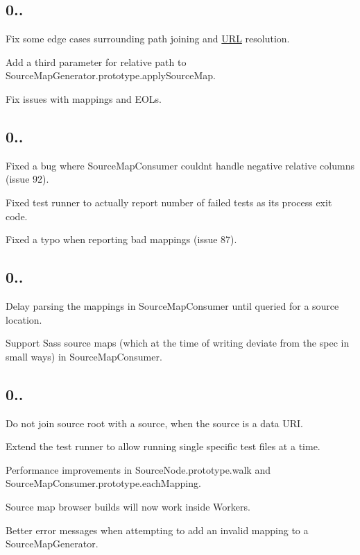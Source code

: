 \subsection*{0..}


\begin{DoxyItemize}
\item Fix some edge cases surrounding path joining and \mbox{\hyperlink{namespace_u_r_l}{U\+RL}} resolution.
\item Add a third parameter for relative path to {\ttfamily Source\+Map\+Generator.\+prototype.\+apply\+Source\+Map}.
\item Fix issues with mappings and E\+O\+Ls.
\end{DoxyItemize}

\subsection*{0..}


\begin{DoxyItemize}
\item Fixed a bug where Source\+Map\+Consumer couldn\textquotesingle{}t handle negative relative columns (issue 92).
\item Fixed test runner to actually report number of failed tests as its process exit code.
\item Fixed a typo when reporting bad mappings (issue 87).
\end{DoxyItemize}

\subsection*{0..}


\begin{DoxyItemize}
\item Delay parsing the mappings in Source\+Map\+Consumer until queried for a source location.
\item Support Sass source maps (which at the time of writing deviate from the spec in small ways) in Source\+Map\+Consumer.
\end{DoxyItemize}

\subsection*{0..}


\begin{DoxyItemize}
\item Do not join source root with a source, when the source is a data U\+RI.
\item Extend the test runner to allow running single specific test files at a time.
\item Performance improvements in {\ttfamily Source\+Node.\+prototype.\+walk} and {\ttfamily Source\+Map\+Consumer.\+prototype.\+each\+Mapping}.
\item Source map browser builds will now work inside Workers.
\item Better error messages when attempting to add an invalid mapping to a {\ttfamily Source\+Map\+Generator}.
\end{DoxyItemize}

